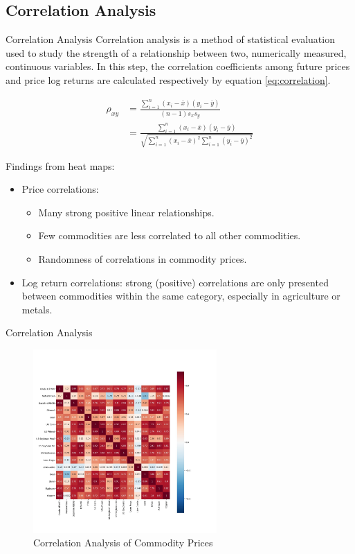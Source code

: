 \documentclass[8pt]{beamer}
\numberwithin{equation}{section}
\begin{document}
\subsection{Correlation Analysis}
\begin{frame}{Correlation Analysis}
Correlation analysis is a method of statistical evaluation used to study the strength of a relationship between two, numerically measured, continuous variables. In this step, the correlation coefficients among future prices and price log returns are calculated respectively by equation \ref{eq:correlation}.

\begin{equation} \label{eq:correlation}
\begin{aligned}
\rho_{xy} &= \frac {\sum_{i=1}^n (x_i-\bar x)(y_i-\bar y)}{(n-1)s_xs_y}
\\
&=\frac {\sum_{i=1}^n (x_i-\bar x)(y_i-\bar y)}{\sqrt{\sum_{i=1}^n(x_i - \bar x)^2 \sum_{i=1}^n(y_i - \bar y)^2}}
\end{aligned}
\end{equation}

Findings from heat maps:

\begin{itemize}
	\item Price correlations: 
		\begin{itemize}
			\item Many strong positive linear relationships.
			\item Few commodities are less correlated to all other commodities.
			\item Randomness of correlations in commodity prices.
		\end{itemize}
	\item Log return correlations: strong (positive) correlations are only presented between commodities within the same category, especially in agriculture or metals.
	
\end{itemize}
\end{frame}

\begin{frame}{Correlation Analysis}
\begin{figure}[!ht]
	\includegraphics[width=7cm]{priceCorrelation.jpg} %
	\caption{Correlation Analysis of Commodity Prices} %
	\label{priceCorrelation} %
\end{figure}

\end{frame}
\end{document}
